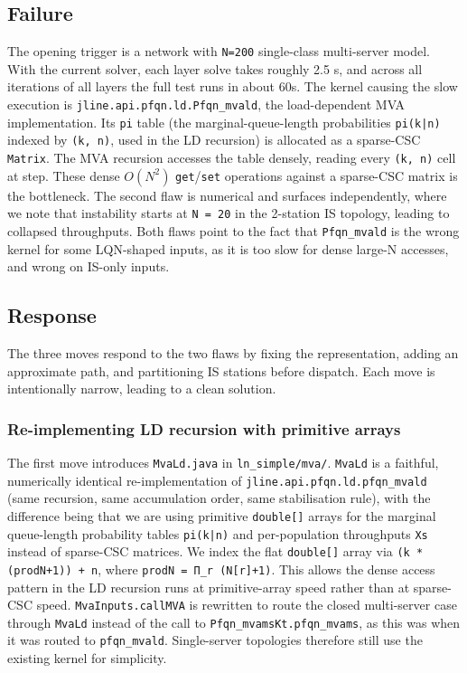 \subsection{Failure}

The opening trigger is a network with \texttt{N=200} single-class multi-server model. With the current solver, each layer solve takes roughly 2.5 s, and across all iterations of all layers the full test runs in about 60s. The kernel causing the slow execution is \texttt{jline.api.pfqn.ld.Pfqn\_mvald}, the load-dependent MVA implementation. Its \texttt{pi} table (the marginal-queue-length probabilities \texttt{pi(k|n)} indexed by \texttt{(k, n)}, used in the LD recursion) is allocated as a sparse-CSC \texttt{Matrix}. The MVA recursion accesses the table densely, reading every \texttt{(k, n)} cell at step. These dense $O(N^2)$ \texttt{get}/\texttt{set} operations against a sparse-CSC matrix is the bottleneck. The second flaw is numerical and surfaces independently, where we note that instability starts at \texttt{N = 20} in the 2-station IS topology, leading to collapsed throughputs. Both flaws point to the fact that \texttt{Pfqn\_mvald} is the wrong kernel for some LQN-shaped inputs, as it is too slow for dense large-N accesses, and wrong on IS-only inputs.

\subsection{Response}

The three moves respond to the two flaws by fixing the representation, adding an approximate path, and partitioning IS stations before dispatch. Each move is intentionally narrow, leading to a clean solution.

\subsubsection*{Re-implementing LD recursion with primitive arrays}

The first move introduces \texttt{MvaLd.java} in \texttt{ln\_simple/mva/}. \texttt{MvaLd} is a faithful, numerically identical re-implementation of \texttt{jline.api.pfqn.ld.pfqn\_mvald} (same recursion, same accumulation order, same stabilisation rule), with the difference being that we are using primitive \texttt{double[]} arrays for the marginal queue-length probability tables \texttt{pi(k|n)} and per-population throughputs \texttt{Xs} instead of sparse-CSC matrices. We index the flat \texttt{double[]} array via \texttt{(k * (prodN+1)) + n}, where \texttt{prodN = Π\_r (N[r]+1)}. This allows the dense access pattern in the LD recursion runs at primitive-array speed rather than at sparse-CSC speed. \texttt{MvaInputs.callMVA} is rewritten to route the closed multi-server case through \texttt{MvaLd} instead of the call to \texttt{Pfqn\_mvamsKt.pfqn\_mvams}, as this was when it was routed to \texttt{pfqn\_mvald}. Single-server topologies therefore still use the existing kernel for simplicity.



